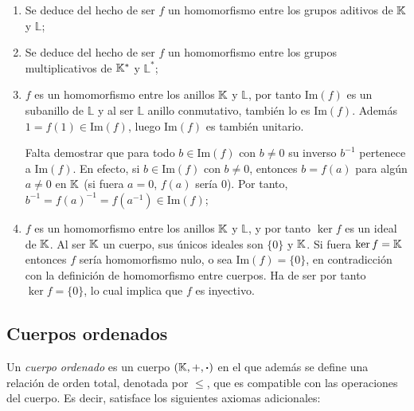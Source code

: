 \begin{fmd-proof}
\begin{enumerate}[label=\alph*)]
	\item Se deduce del hecho de ser $f$ un homomorfismo entre los grupos aditivos de $\mathbb{K}$ y $\mathbb{L}$;
	\item Se deduce del hecho de ser $f$ un homomorfismo entre los grupos multiplicativos de $\mathbb{K}^*$ y $\mathbb{L}^*$;
	\item $f$ es un homomorfismo entre los anillos $\mathbb{K}$ y $\mathbb{L}$, por tanto $\mbox{Im}(f)$ es un subanillo de $\mathbb{L}$ y al ser $\mathbb{L}$ anillo conmutativo, también lo es $\mbox{Im}(f)$. Además $1 = f(1) \in \mbox{Im}(f)$, luego $\mbox{Im}(f)$ es también unitario.
	
	Falta demostrar que para todo $b \in \mbox{Im}(f)$ con $b\ne 0$ su inverso $b^{-1}$ pertenece a $\mbox{Im}(f)$. En efecto, si $b \in \mbox{Im}(f)$ con $b \ne 0$, entonces $b = f(a)$ para algún $a \ne 0$ en $\mathbb{K}$ (si fuera $a=0$, $f(a)$ sería 0). Por tanto, $b^{-1} = f(a)^{-1} = f(a^{-1}) \in \mbox{Im}(f)$;
	
	\item $f$ es un homomorfismo entre los anillos $\mathbb{K}$ y $\mathbb{L}$, y por tanto $\ker f$ es un ideal de $\mathbb{K}$. Al ser $\mathbb{K}$ un cuerpo, sus únicos ideales son $\{0\}$ y $\mathbb{K}$. Si fuera $\ker f = \mathbb{K}$ entonces $f$ sería homomorfismo nulo, o sea $\mbox{Im}(f) = \{0\}$, en contradicción con la definición de homomorfismo entre cuerpos. Ha de ser por tanto $\ker f = \{0\}$, lo cual implica que $f$ es inyectivo.
\end{enumerate}
\end{fmd-proof}

\subsection{Cuerpos ordenados}

Un \textit{cuerpo ordenado} es un cuerpo $(\mathbb{K}, +, \boldsymbol{\cdot})$ en el que además se define una relación de orden total, denotada por $\leq$, que es compatible con las operaciones del cuerpo. Es decir, satisface los siguientes axiomas adicionales:

